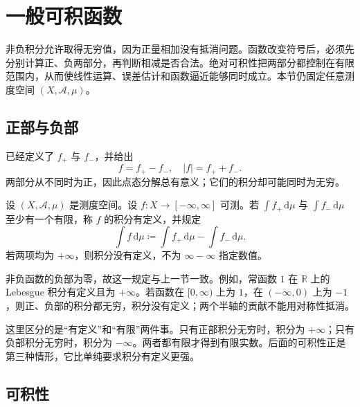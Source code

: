\section{一般可积函数}
\label{b1:sec:0502}


非负积分允许取得无穷值，因为正量相加没有抵消问题。函数改变符号后，必须先分别计算正、负两部分，再判断相减是否合法。绝对可积性把两部分都控制在有限范围内，从而使线性运算、误差估计和函数逼近能够同时成立。本节仍固定任意测度空间 \((X,\mathcal A,\mu)\)。

\subsection{正部与负部}
\label{b1:subsec:050201}

已经定义了 \(f_+\) 与 \(f_-\)，并给出
\[
f=f_+-f_-,\quad |f|=f_++f_-.
\]
两部分从不同时为正，因此点态分解总有意义；它们的积分却可能同时为无穷。

\begin{definition}\label{b1:def:signed-integral}
设 \((X,\mathcal A,\mu)\) 是测度空间。设 \(f:X\rightarrow[-\infty,\infty]\) 可测。若 \(\int f_+\,\mathrm d\mu\) 与 \(\int f_-\,\mathrm d\mu\) 至少有一个有限，称 \(f\) 的积分有定义，并规定
\[
\int f\,\mathrm d\mu
\coloneqq\int f_+\,\mathrm d\mu-\int f_-\,\mathrm d\mu.
\]
若两项均为 \(+\infty\)，则积分没有定义，不为 \(\infty-\infty\) 指定数值。
\end{definition}

非负函数的负部为零，故这一规定与上一节一致。例如，常函数 \(1\) 在 \(\mathbb R\) 上的 Lebesgue 积分有定义且为 \(+\infty\)。若函数在 \([0,\infty)\) 上为 \(1\)，在 \((-\infty,0)\) 上为 \(-1\)，则正、负部的积分都无穷，积分没有定义；两个半轴的贡献不能用对称性抵消。

\ProseParagraphBreak

这里区分的是“有定义”和“有限”两件事。只有正部积分无穷时，积分为 \(+\infty\)；只有负部积分无穷时，积分为 \(-\infty\)。两者都有限才得到有限实数。后面的可积性正是第三种情形，它比单纯要求积分有定义更强。

\subsection{可积性}
\label{b1:subsec:050202}

